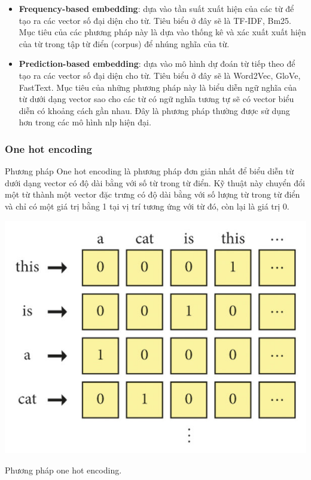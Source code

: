 \documentclass[a4paper, 12pt, openany]{book}
\begin{document}
\begin{itemize}
    \item \textbf{Frequency-based embedding}: dựa vào tần suất xuất hiện của các từ để tạo ra các
    vector số đại diện cho từ. Tiêu biểu ở đây sẽ là TF-IDF, Bm25. Mục tiêu của các phương pháp này là
    dựa vào thống kê và xác xuất xuất hiện của từ trong tập từ điển (corpus) để nhúng nghĩa của từ.

    \item \textbf{Prediction-based embedding}: dựa vào mô hình dự đoán từ tiếp theo để tạo ra các
    vector số đại diện cho từ. Tiêu biểu ở đây sẽ là Word2Vec, GloVe, FastText. Mục tiêu của những
    phương pháp này là biểu diễn ngữ nghĩa của từ dưới dạng vector sao cho 
    các từ có ngữ nghĩa tương tự sẽ có vector biểu diễn có khoảng cách gần nhau. Đây là phương pháp
    thường được sử dụng hơn trong các mô hình \ac{nlp} hiện đại.
\end{itemize}

\subsubsection{One hot encoding}
Phương pháp One hot encoding là phương pháp đơn giản nhất để biểu diễn từ dưới dạng vector có độ dài bằng với số từ trong từ điển.
Kỹ thuật này chuyển đổi một từ thành một vector đặc trưng có độ
dài bằng với số lượng từ trong từ điển và chỉ có một giá trị bằng 1 tại vị trí tương ứng với
từ đó, còn lại là giá trị 0.

\begin{minipage}{\linewidth}
    \captionsetup{type=figure}
    \centering
    \includegraphics[width=\linewidth]{./assets/images/onehot.png}
    \caption{Phương pháp one hot encoding.}
\end{minipage}
\vspace{0.5cm}
\end{document}
